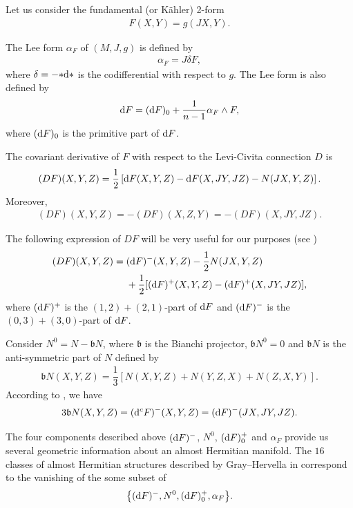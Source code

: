 \documentclass[pdftex]{sigma}%
\numberwithin{equation}{section}
\begin{document}
Let us consider the fundamental (or K\"ahler) 2-form
\begin{gather*}
F(X,Y)=g(JX,Y).
\end{gather*}

The Lee form $\alpha_{F}$ of $(M,J,g)$ is defined by
\begin{gather*}
\alpha_{F}=J\delta F,
\end{gather*}
where $\delta=-{*{\rm d}*}$ is the codifferential with respect to $g$. The Lee form is also defined by
\begin{gather*}
{\rm d}F=({\rm d}F)_{0}+\dfrac{1}{n-1}\alpha_{F}\wedge F,
\end{gather*}
where $({\rm d}F)_{0}$ is the primitive part of ${\rm d}F$.

The covariant derivative of $F$ with respect to the Levi-Civita connection $D$ is
\begin{gather*}
(DF)(X,Y,Z)=\dfrac{1}{2}\left[{\rm d}F(X,Y,Z)-{\rm d}F(X,JY,JZ)-N(JX,Y,Z)\right].
\end{gather*}
Moreover,
\begin{gather*}
(DF)(X,Y,Z)=-(DF)(X,Z,Y)=-(DF)(X,JY,JZ).
\end{gather*}

{\samepage
The following expression of $DF$ will be very useful for our purposes (see \cite{fu,gau})
\begin{align*}
(DF)(X,Y,Z)={}&({\rm d}F)^{-}(X,Y,Z)-\dfrac{1}{2}N(JX,Y,Z)
\\
&+\dfrac{1}{2}[({\rm d}F)^{+}(X,Y,Z)-({\rm d}F)^{+}(X,JY,JZ)],
\end{align*}
where
$({\rm d}F)^{+}$ is the $(1,2)+(2,1)$-part of ${\rm d}F$ and $({\rm d}F)^{-}$ is the $(0,3)+(3,0)$-part of ${\rm d}F$.

}

Consider $N^{0}=N-\mathfrak{b}N$, where $\mathfrak{b}$ is the Bianchi projector, $\mathfrak{b}N^{0}=0$ and $\mathfrak{b}N$ is the anti-symmetric part of $N$ defined by
\begin{gather*}
\mathfrak{b}N(X,Y,Z)=\dfrac{1}{3}[N(X,Y,Z)+N(Y,Z,X)+N(Z,X,Y)].
\end{gather*}
According to \cite{gau}, we have
\begin{gather*}
3\mathfrak{b}N(X,Y,Z)=({\rm d}^{c}F)^{-}(X,Y,Z)=({\rm d}F)^{-}(JX,JY,JZ).
\end{gather*}

The four components described above $({\rm d}F)^{-}$, $N^{0}$, $({\rm d}F)^{+}_{0}$ and $\alpha_{F}$ provide us several geometric information about an almost Hermitian manifold. The $16$ classes of almost Hermitian structures described by Gray--Hervella in \cite{sub} correspond to the vanishing of the some subset of
\begin{gather*}
\big\{({\rm d}F)^{-}, N^{0}, ({\rm d}F)^{+}_{0},\alpha_{F}\big\}.
\end{gather*}
\end{document}
